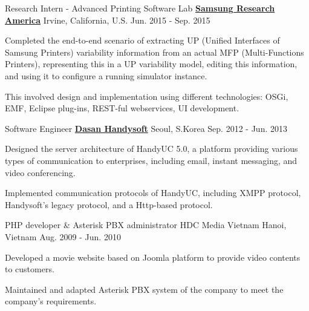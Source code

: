 \begin{cventries}
\cventry
{Research Intern -  Advanced Printing Software Lab} %
{\href{http://www.sra.samsung.com}{\bf Samsung Research America}} %
{Irvine, California, U.S.} %
{Jun. 2015 - Sep. 2015} %
{
  \begin{cvitems} %
    \item Completed the end-to-end scenario of extracting UP (Unified Interfaces of Samsung Printers) variability information from an actual MFP (Multi-Functions Printers), representing this in a UP variability model, editing this information, and using it to configure a running simulator instance.
    \item This involved design and implementation using different technologies: OSGi, EMF, Eclipse plug-ins, REST-ful webservices, UI development.
  \end{cvitems}
}

\cventry
{Software Engineer} %
{\href{http://www.handysoft.co.kr}{\bf Dasan Handysoft}} %
{Seoul, S.Korea} %
{Sep. 2012 - Jun. 2013} %
{
  \begin{cvitems} %
    \item  Designed the server architecture of HandyUC 5.0, a platform providing various types of communication to enterprises, including email, instant messaging, and video conferencing.
    \item Implemented communication protocols of HandyUC, including XMPP protocol, Handysoft's legacy protocol, and a Http-based protocol.
  \end{cvitems}
}

\cventry
{PHP developer \& Asterisk PBX administrator} %
{HDC Media Vietnam} %
{Hanoi, Vietnam} %
{Aug. 2009 - Jun. 2010} %
{
  \begin{cvitems} %
   \item Developed a movie website based on Joomla platform to provide video contents to customers.
   \item Maintained and adapted Asterisk PBX system of the company to meet the company's requirements.
  \end{cvitems}
}

\end{cventries}
